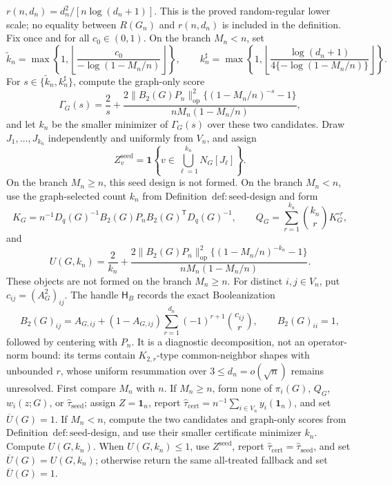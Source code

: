 \(r(n,d_n)=d_n^2/[n\log(d_n+1)]\).  This is the proved random-regular lower scale; no equality between \(R(G_n)\) and \(r(n,d_n)\) is included in the definition.
Fix once and for all \(c_0\in(0,1)\).  On the branch \(M_n<n\), set
\[
\widetilde k_n=\max\!\left\{1,\left\lfloor\frac{c_0}{-\log(1-M_n/n)}\right\rfloor\right\},
\qquad
k_n^\sharp=\max\!\left\{1,\left\lfloor
\frac{\log(d_n+1)}{4\{-\log(1-M_n/n)\}}
\right\rfloor\right\}.
\]
For \(s\in\{\widetilde k_n,k_n^\sharp\}\), compute the graph-only score
\[
\Gamma_G(s)=\frac2s+
\frac{2\|B_2(G)P_n\|_{\mathrm{op}}^2\{(1-M_n/n)^{-s}-1\}}
{nM_n(1-M_n/n)},
\]
and let \(k_n\) be the smaller minimizer of \(\Gamma_G(s)\) over these two candidates.  Draw \(J_1,\ldots,J_{k_n}\) independently and uniformly from \(V_n\), and assign
\[
Z^{\mathrm{seed}}_v=\mathbf 1\!\left\{v\in\bigcup_{\ell=1}^{k_n}N_G[J_\ell]\right\}.
\]
On the branch \(M_n\ge n\), this seed design is not formed.
On the branch \(M_n<n\), use the graph-selected count \(k_n\) from Definition~\(\mathrm{def{:}seed\mbox{-}design}\) and form
\[
K_G=n^{-1}D_q(G)^{-1}B_2(G)P_nB_2(G)^{\mathsf T}D_q(G)^{-1},
\qquad
Q_G=\sum_{r=1}^{k_n}\binom{k_n}{r}K_G^{\circ r},
\]
and
\[
U(G,k_n)=\frac{2}{k_n}+
\frac{2\|B_2(G)P_n\|_{\mathrm{op}}^2\{(1-M_n/n)^{-k_n}-1\}}
{nM_n(1-M_n/n)}.
\]
These objects are not formed on the branch \(M_n\ge n\).
For distinct \(i,j\in V_n\), put \(c_{ij}=(A_G^2)_{ij}\).  The handle \(\mathsf H_B\) records the exact Booleanization
\[
B_2(G)_{ij}=A_{G,ij}+(1-A_{G,ij})
\sum_{r=1}^{d_n}(-1)^{r+1}\binom{c_{ij}}{r},
\qquad B_2(G)_{ii}=1,
\]
followed by centering with \(P_n\).  It is a diagnostic decomposition, not an operator-norm bound: its terms contain \(K_{2,r}\)-type common-neighbor shapes with unbounded \(r\), whose uniform resummation over \(3\le d_n=o(\sqrt n)\) remains unresolved.
First compare \(M_n\) with \(n\).  If \(M_n\ge n\), form none of \(\pi_i(G)\), \(Q_G\), \(w_i(z;G)\), or \(\widehat\tau_{\mathrm{seed}}\); assign \(Z=\mathbf 1_n\), report \(\widehat\tau_{\mathrm{cert}}=n^{-1}\sum_{i\in V_n}y_i(\mathbf 1_n)\), and set \(\overline U(G)=1\).  If \(M_n<n\), compute the two candidates and graph-only scores from Definition~\(\mathrm{def{:}seed\mbox{-}design}\), and use their smaller certificate minimizer \(k_n\).  Compute \(U(G,k_n)\).  When \(U(G,k_n)\le1\), use \(Z^{\mathrm{seed}}\), report \(\widehat\tau_{\mathrm{cert}}=\widehat\tau_{\mathrm{seed}}\), and set \(\overline U(G)=U(G,k_n)\); otherwise return the same all-treated fallback and set \(\overline U(G)=1\).
